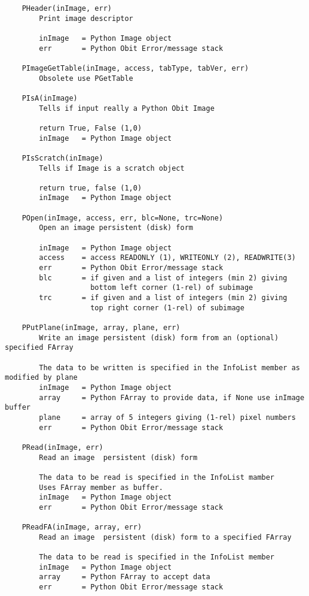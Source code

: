 \documentclass[11pt]{report}
\begin{document}
\begin{verbatim}
    PHeader(inImage, err)
        Print image descriptor
        
        inImage   = Python Image object
        err       = Python Obit Error/message stack
    
    PImageGetTable(inImage, access, tabType, tabVer, err)
        Obsolete use PGetTable
    
    PIsA(inImage)
        Tells if input really a Python Obit Image
        
        return True, False (1,0)
        inImage   = Python Image object
    
    PIsScratch(inImage)
        Tells if Image is a scratch object
        
        return true, false (1,0)
        inImage   = Python Image object
    
    POpen(inImage, access, err, blc=None, trc=None)
        Open an image persistent (disk) form
        
        inImage   = Python Image object
        access    = access READONLY (1), WRITEONLY (2), READWRITE(3)
        err       = Python Obit Error/message stack
        blc       = if given and a list of integers (min 2) giving
                    bottom left corner (1-rel) of subimage
        trc       = if given and a list of integers (min 2) giving
                    top right corner (1-rel) of subimage
    
    PPutPlane(inImage, array, plane, err)
        Write an image persistent (disk) form from an (optional) specified FArray
        
        The data to be written is specified in the InfoList member as modified by plane
        inImage   = Python Image object
        array     = Python FArray to provide data, if None use inImage buffer
        plane     = array of 5 integers giving (1-rel) pixel numbers
        err       = Python Obit Error/message stack
    
    PRead(inImage, err)
        Read an image  persistent (disk) form
        
        The data to be read is specified in the InfoList mamber
        Uses FArray member as buffer.
        inImage   = Python Image object
        err       = Python Obit Error/message stack
    
    PReadFA(inImage, array, err)
        Read an image  persistent (disk) form to a specified FArray
        
        The data to be read is specified in the InfoList member
        inImage   = Python Image object
        array     = Python FArray to accept data
        err       = Python Obit Error/message stack
    

\end{verbatim}
\end{document}
